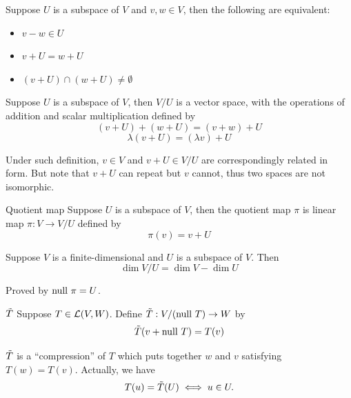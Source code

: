 \documentclass[12pt,a4paper]{article}
\begin{document}
    \begin{prop}
        Suppose $U$ is a subspace of $V$ and $v,w\in V$, then the following are equivalent:
        \begin{itemize}
            \item $v-w\in U$
            \item $v+U=w+U$
            \item $(v+U)\cap(w+U)\neq\emptyset$
        \end{itemize}
    \end{prop}
    \hfill
    
    \begin{prop}
        Suppose $U$ is a subspace of $V$, then $V/U$ is a vector space, with the operations of addition and scalar multiplication defined by
        $$
        (v+U)+(w+U)=(v+w)+U
        $$$$
        \lambda(v+U)=(\lambda v)+U
        $$
    \end{prop}
    \begin{remark}
        Under such definition, $v\in V$ and $v+U\in V/U$ are correspondingly related in form. But note that $v+U$ can repeat but $v$ cannot, thus two spaces are not isomorphic.
    \end{remark}
    \hfill

    \begin{defi}{Quotient map}%
        Suppose $U$ is a subspace of $V$, then the quotient map $\pi$ is linear map $\pi:V\to V/U$ defined by 
        $$
        \pi(v)=v+U
        $$
    \end{defi}
    \hfill
    
    \begin{prop}\label{3.58}
        Suppose $V$ is a finite-dimensional and $U$ is a subspace of $V$. Then
        $$
        \dim V/U=\dim V-\dim U
        $$
    \end{prop}
    \begin{remark}
        Proved by $\operatorname{null\,}\pi=U$.
    \end{remark}
    \hfill

    \begin{defi}{$\Tilde{T}$}
        Suppose $T\in\mathcal{L}(V,W)$. Define $\Tilde{T}:V/(\operatorname{null\,} T)\to W$ by 
        $$
        \Tilde{T}(v+\operatorname{null\,} T)=T(v)
        $$
    \end{defi}
    \begin{remark}
        $\Tilde{T}$ is a “compression” of $T$ which puts together $w$ and $v$ satisfying $T(w)=T(v)$. Actually, we have 
        $$
        T(u)=\Tilde{T}(U)\iff u\in U.
        $$
    \end{remark}
    \hfill
\end{document}
